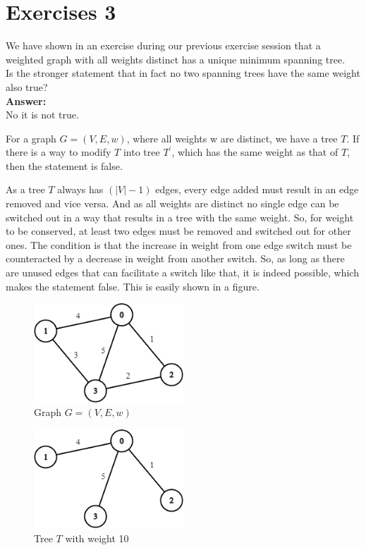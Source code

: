 \documentclass[nobib]{tufte-handout}
\newcounter{counter}
\begin{document}
\section{Exercises 3}
We have shown in an exercise during our previous exercise session that a weighted graph with all weights distinct has a unique minimum spanning tree. \\  

Is the stronger statement that in fact no two spanning trees have the same weight also true? \\

\textbf{Answer:} \\ 
No it is not true.

For a graph $G = (V,E,w)$, where all weights w are distinct, we have a tree $T$. If there is a way to modify $T$ into tree $T^\prime$, which has the same weight as that of $T$, then the statement is false. 

As a tree $T$ always has $(|V|-1)$ edges, every edge added must result in an edge removed and vice versa. And as all weights are distinct no single edge can be switched out in a way that results in a tree with the same weight. So, for weight to be conserved, at least two edges must be removed and switched out for other ones. The condition is that the increase in weight from one edge switch must be counteracted by a decrease in weight from another switch. So, as long as there are unused edges that can facilitate a switch like that, it is indeed possible, which makes the statement false. This is easily shown in a figure.

\begin{figure}
    \centering
    \includegraphics[width=0.5\textwidth]{graphics/L6_prim_kruskal_dijkstra/distinctWeights.png}
    \caption{Graph $G = (V,E,w)$}
    \label{fig:G}
\end{figure}

\begin{figure}
    \centering
    \includegraphics[width=0.5\textwidth]{graphics/L6_prim_kruskal_dijkstra/distinctWeights2.png}
    \caption{Tree $T$ with weight 10}
    \label{fig:T}
\end{figure}
\end{document}
